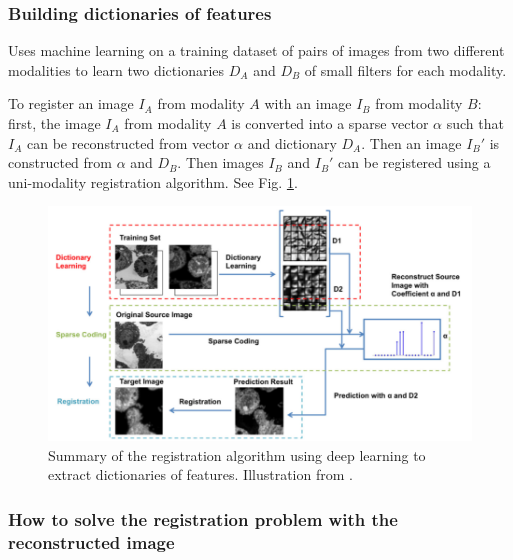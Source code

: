 \documentclass[11pt]{article} %
\begin{document}
    \subsubsection{Building dictionaries of features \cite{cao:analogies}}
Uses machine learning on a training dataset of pairs of images from two different modalities to learn two dictionaries $D_A$ and $D_B$ of small filters for each modality.

To register an image $I_A$ from modality $A$ with an image $I_B$ from modality $B$: first, the image $I_A$ from modality $A$ is converted into a sparse vector $\alpha$ such that $I_A$ can be reconstructed from vector $\alpha$ and dictionary $D_A$. Then an image $I_B'$ is constructed from $\alpha$ and $D_B$. Then images $I_B$ and $I_B'$ can be registered using a uni-modality registration algorithm. See Fig. \ref{fig:dico}.
\begin{figure}[h!]
  \centering
  \includegraphics[width=\linewidth]{dico.png}
  \caption{Summary of the registration algorithm using deep learning to extract dictionaries of features. Illustration from \cite{cao:analogies}.}
  \label{fig:dico}
\end{figure}

\subsubsection{How to solve the registration problem with the reconstructed image}
\end{document}

